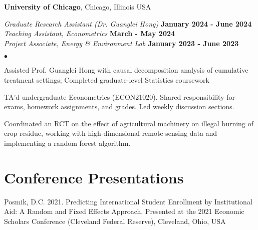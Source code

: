 \documentclass[margin,line]{res}
\newenvironment{list2}{
  \begin{list}{$\bullet$}{%
      \setlength{\itemsep}{0in}
      \setlength{\parsep}{0in} \setlength{\parskip}{0in}
      \setlength{\topsep}{0in} \setlength{\partopsep}{0in} 
      \setlength{\leftmargin}{0.2in}}}{\end{list}}
\begin{document}
\begin{resume}
{\bf University of Chicago}, Chicago, Illinois USA

\vspace{-.3cm}
{\em Graduate Research Assistant (Dr. Guanglei Hong)} \hfill {\bf January 2024 - June 2024}\\
{\em Teaching Assistant, Econometrics} \hfill {\bf March - May 2024}\\
{\em Project Associate, Energy \& Environment Lab} \hfill {\bf January 2023 - June 2023}\\

\begin{list2}
\item Assisted Prof. Guanglei Hong with causal decomposition analysis of cumulative treatment settings; Completed graduate-level Statistics coursework
\item TA'd undergraduate Econometrics (ECON21020). Shared responsibility for exams, homework assignments, and grades. Led weekly discussion sections.  
\item Coordinated an RCT on the effect of agricultural machinery on illegal burning of crop residue, working with high-dimensional remote sensing data and implementing a random forest algorithm.  
\end{list2}



\section{\sc Conference Presentations}
Posmik, D.C. 2021. Predicting International Student Enrollment by Institutional Aid: A Random and Fixed Effects Approach. Presented at the 2021 Economic Scholars Conference (Cleveland Federal Reserve), Cleveland, Ohio, USA



\end{resume}
\end{document}
